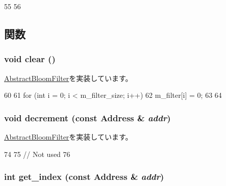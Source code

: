 \begin{DoxyCode}
55 {
56 }
\end{DoxyCode}


\subsection{関数}
\hypertarget{classNonCountingBloomFilter_ac8bb3912a3ce86b15842e79d0b421204}{
\subsubsection[{clear}]{\setlength{\rightskip}{0pt plus 5cm}void clear ()}}
\label{classNonCountingBloomFilter_ac8bb3912a3ce86b15842e79d0b421204}


\hyperlink{classAbstractBloomFilter_a5eeb94d22b8366d1b68d0614384802fe}{AbstractBloomFilter}を実装しています。


\begin{DoxyCode}
60 {
61     for (int i = 0; i < m_filter_size; i++) {
62         m_filter[i] = 0;
63     }
64 }
\end{DoxyCode}
\hypertarget{classNonCountingBloomFilter_addb6b805abb8328082a24926f2bf8c84}{
\subsubsection[{decrement}]{\setlength{\rightskip}{0pt plus 5cm}void decrement (const {\bf Address} \& {\em addr})}}
\label{classNonCountingBloomFilter_addb6b805abb8328082a24926f2bf8c84}


\hyperlink{classAbstractBloomFilter_aa387151f4ab03c6cd497d4385e34c21a}{AbstractBloomFilter}を実装しています。


\begin{DoxyCode}
74 {
75     // Not used
76 }
\end{DoxyCode}
\hypertarget{classNonCountingBloomFilter_a0a9fd2f2f75033080fc27830f7c0fe64}{
\subsubsection[{get\_\-index}]{\setlength{\rightskip}{0pt plus 5cm}int get\_\-index (const {\bf Address} \& {\em addr})}}
\label{classNonCountingBloomFilter_a0a9fd2f2f75033080fc27830f7c0fe64}



